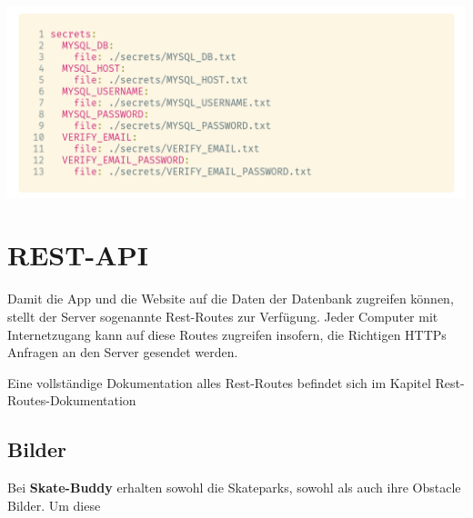 \begin{code}[htp]
    \begin{center}
        \includegraphics[width=1\textwidth]{images/Backend/secrets.png}
        \vspace{-25pt}
        \caption{Sokkas Docker Secrets in der \lstinline{docker-compose.yml}}
    \end{center}
\end{code}

\section{REST-API}

Damit die App und die Website auf die Daten der Datenbank zugreifen können, stellt der Server sogenannte Rest-Routes zur Verfügung. Jeder Computer mit Internetzugang kann auf diese Routes zugreifen insofern, die Richtigen HTTPs Anfragen an den Server gesendet werden.

Eine vollständige Dokumentation alles Rest-Routes befindet sich im Kapitel Rest-Routes-Dokumentation


\subsection{Bilder}

Bei \textbf{Skate-Buddy} erhalten sowohl die Skateparks, sowohl als auch ihre Obstacle Bilder. Um diese

